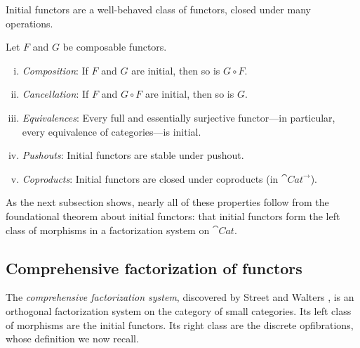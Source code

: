 \documentclass[11pt]{article}
\numberwithin{equation}{section}
\begin{document}
Initial functors are a well-behaved class of functors, closed under many
operations.
\begin{proposition}
  \label{prop:initial-functor-closure-properties}
  Let $F$ and $G$ be composable functors.
  \begin{enumerate}[(i),noitemsep]
    \item \emph{Composition}: If $F$ and $G$ are initial, then so is $G \circ F$.
    \item \emph{Cancellation}: If $F$ and $G \circ F$ are initial, then so is $G$.
    \item \emph{Equivalences}: Every full and essentially surjective
      functor---in particular, every equivalence of categories---is initial.
    \item \emph{Pushouts}: Initial functors are stable under pushout.
    \item \emph{Coproducts}: Initial functors are closed under coproducts (in
      $\cat{Cat}^{\to}$).
  \end{enumerate}
\end{proposition}

As the next subsection shows, nearly all of these properties follow from the
foundational theorem about initial functors: that initial functors form the left
class of morphisms in a factorization system on $\cat{Cat}$.

\subsection{Comprehensive factorization of functors}

The \emph{comprehensive factorization system}, discovered by Street and Walters
\cite{street1973}, is an orthogonal factorization system on the category of
small categories. Its left class of morphisms are the initial functors. Its
right class are the discrete opfibrations, whose definition we now recall.
\end{document}
